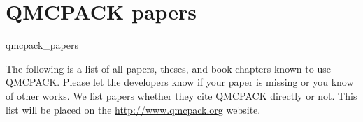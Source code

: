 \chapter{QMCPACK papers}
\begin{btSect}{qmcpack_papers}

 The following is a list of all papers, theses, and book chapters known to use QMCPACK. Please let the developers know if your paper is missing or you know of other works. We list papers whether they cite QMCPACK directly or not. This list will be placed on the \url{http://www.qmcpack.org} website.

\btPrintAll

\end{btSect}
 